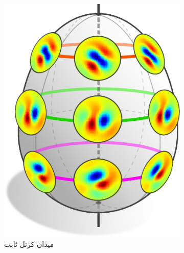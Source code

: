 \begin{figure}
	\hspace{1.ex}
	\begin{subfigure}[b]{0.24\textwidth}
		\includegraphics[width=.92\textwidth]{figures/isometry_egg_intro_symmetric.pdf}
		\vspace*{-.5ex}
		\captionsetup{format=hang, width=.8\textwidth}
		\caption{\small
			میدان کرنل ثابت 
		}
		\label{fig:isom_invariant_kernel_field_intro_SO2}
	\end{subfigure}
	\hspace*{1.5ex}
	\begin{subfigure}[b]{0.24\textwidth}

\end{subfigure}
\end{figure}
